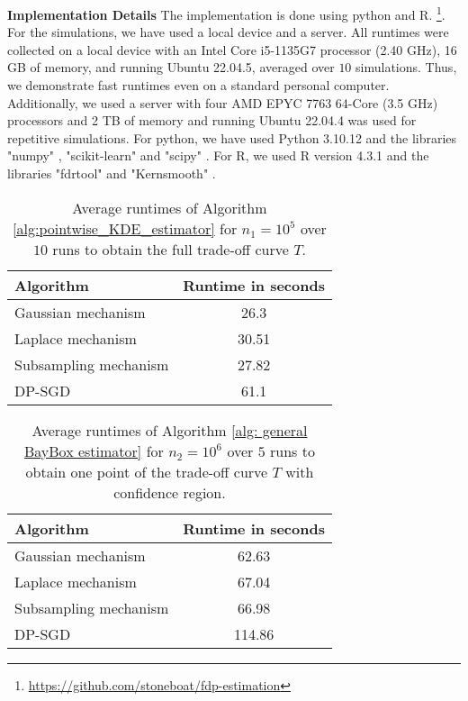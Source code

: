 \noindent\textbf{Implementation Details} The implementation is done using python and R. \footnote{\scriptsize{\url{https://github.com/stoneboat/fdp-estimation}}}. For the simulations, we have used a local device and a server. All runtimes were collected on a local device with an Intel Core i5-1135G7 processor (2.40 GHz), 16 GB of memory, and running Ubuntu 22.04.5, averaged over $10$ simulations. Thus, we demonstrate fast runtimes even on a standard personal computer.
Additionally, we used a server with four AMD EPYC 7763 64-Core (3.5 GHz) processors and 2 TB of memory and running Ubuntu 22.04.4 was used for repetitive simulations. For python, we have used Python 3.10.12 and the libraries "numpy" \cite{2020NumPy-Array}, "scikit-learn" \cite{pedregosa2011scikit} and "scipy" \cite{2020SciPy-NMeth}. For R, we used R version 4.3.1 and the libraries "fdrtool" \cite{fdrtool} and "Kernsmooth" \cite{Kernsmooth}. 
\begin{table}[h!]
\centering
\begin{tabular}{|l|c|}
\hline
\textbf{Algorithm}                           & \textbf{Runtime in seconds} \\ \hline
Gaussian mechanism              &  26.3                                                    \\ \hline
Laplace mechanism            &    30.51                                                     \\ \hline
Subsampling mechanism         &   27.82                                                      \\ \hline
DP-SGD           &              61.1                                         \\ \hline
 
\end{tabular}
\caption{Average runtimes of Algorithm \ref{alg:pointwise_KDE_estimator} for $n_1=10^5$ over $10$ runs to obtain the full trade-off curve $T$.}
\label{tab:running_times_KDE}
\end{table}
\begin{table}[h!]
\centering
\begin{tabular}{|l|c|}
\hline
\textbf{Algorithm}                           & \textbf{Runtime in seconds} \\ \hline
Gaussian mechanism              &    62.63                                                  \\ \hline
Laplace mechanism            &        67.04                                                 \\ \hline
Subsampling mechanism         &     66.98                                                  \\ \hline
DP-SGD           &    114.86                                                 \\ \hline
 
\end{tabular}
\caption{Average runtimes of Algorithm \ref{alg: general BayBox estimator} for $n_2=10^6$ over $5$ runs to obtain one point of the trade-off curve $T$ with confidence region.} %
\label{tab:running_times_kNN}
\end{table}

